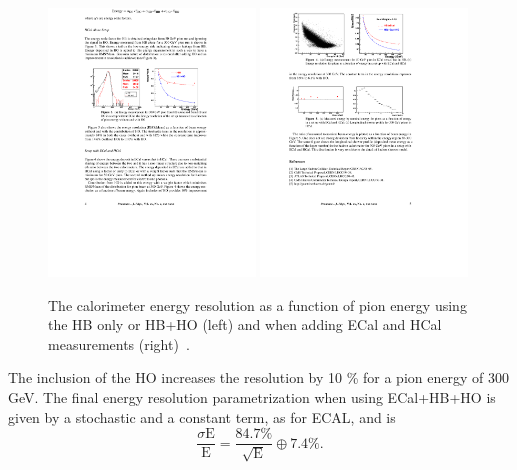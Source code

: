 \begin{figure}[h] 
    \centering
    \includegraphics[width=0.49\textwidth]{figures/cms/hcal_res.pdf}
    \includegraphics[width=0.49\textwidth]{figures/cms/hcal_ecal_res.pdf}
    \caption{The calorimeter energy resolution as a function of pion energy using the HB only or HB+HO (left) and when adding ECal and HCal measurements (right)~\cite{Sharma2007}.}
    \label{fig:cms:hcal-res}
\end{figure}

The inclusion of the HO increases the resolution by 10 \% for a pion energy of 300 GeV.
The final energy resolution parametrization when using ECal+HB+HO is given by a stochastic and a constant term, as for ECAL, and is
\begin{equation*}
  \frac{\sigma \textrm{E}}{\textrm{E}} = \frac{84.7 \%}{\sqrt{\textrm{E}}}\oplus 7.4 \%.
\end{equation*}

